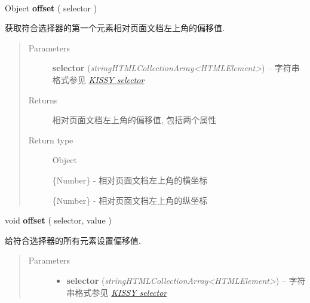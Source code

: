 \documentclass[letterpaper,10pt,english]{sphinxmanual}
\begin{document}
\begin{fulllineitems}
\label{api/core/dom/offset:DOM.offset}~
\begin{DUlineblock}{0em}
\item[] Object \textbf{offset} ( selector )
\item[] 获取符合选择器的第一个元素相对页面文档左上角的偏移值.
\end{DUlineblock}
\begin{quote}\begin{description}
\item[{Parameters}] \leavevmode
\textbf{selector} (\emph{string\textbar{}HTMLCollection\textbar{}Array\textless{}HTMLElement\textgreater{}}) -- 字符串格式参见 {\hyperref[api/core/dom/selector:dom-selector]{\emph{KISSY selector}}}

\item[{Returns}] \leavevmode
相对页面文档左上角的偏移值, 包括两个属性

\item[{Return type}] \leavevmode

Object


\begin{fulllineitems}
\label{api/core/dom/offset:DOM.left}
\{Number\} - 相对页面文档左上角的横坐标

\end{fulllineitems}



\begin{fulllineitems}
\label{api/core/dom/offset:DOM.top}
\{Number\} - 相对页面文档左上角的纵坐标

\end{fulllineitems}



\end{description}\end{quote}

\begin{DUlineblock}{0em}
\item[] void \textbf{offset} ( selector, value )
\item[] 给符合选择器的所有元素设置偏移值.
\end{DUlineblock}
\begin{quote}\begin{description}
\item[{Parameters}] \leavevmode\begin{itemize}
\item {}
\textbf{selector} (\emph{string\textbar{}HTMLCollection\textbar{}Array\textless{}HTMLElement\textgreater{}}) -- 字符串格式参见 {\hyperref[api/core/dom/selector:dom-selector]{\emph{KISSY selector}}}


\end{itemize}
\end{description}
\end{quote}
\end{fulllineitems}
\end{document}
